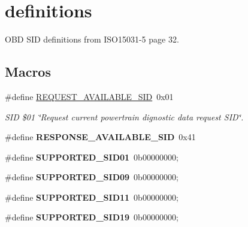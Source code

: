 \hypertarget{group__OBD__SID}{}\section{definitions}
\label{group__OBD__SID}


O\+BD S\+ID definitions from I\+S\+O15031-\/5 page 32.  


\subsection*{Macros}
\begin{DoxyCompactItemize}
\item 
\mbox{\label{group__OBD__SID_ga94a3417f78b904f0e9f461cce0b6641c}} 
\#define \hyperlink{group__OBD__SID_ga94a3417f78b904f0e9f461cce0b6641c}{R\+E\+Q\+U\+E\+S\+T\+\_\+\+A\+V\+A\+I\+L\+A\+B\+L\+E\+\_\+\+S\+ID}~0x01
\begin{DoxyCompactList}\small\item\em S\+ID \$01 \char`\"{}\+Request current powertrain dignostic data request S\+I\+D\char`\"{}. \end{DoxyCompactList}\item 
\mbox{\label{group__OBD__SID_ga59a24bd5d712dcfc0cc82303b8aac0b0}} 
\#define {\bfseries R\+E\+S\+P\+O\+N\+S\+E\+\_\+\+A\+V\+A\+I\+L\+A\+B\+L\+E\+\_\+\+S\+ID}~0x41
\item 
\mbox{\label{group__OBD__SID_gae4d5ffcfa37cfa6e858191b68a8ad72c}} 
\#define {\bfseries S\+U\+P\+P\+O\+R\+T\+E\+D\+\_\+\+S\+I\+D01}~0b00000000;
\item 
\mbox{\label{group__OBD__SID_ga34a3a33eeb5a57c0f2d575f3fda69d33}} 
\#define {\bfseries S\+U\+P\+P\+O\+R\+T\+E\+D\+\_\+\+S\+I\+D09}~0b00000000;
\item 
\mbox{\label{group__OBD__SID_gac5a9b7291411c8bc51112d74af772399}} 
\#define {\bfseries S\+U\+P\+P\+O\+R\+T\+E\+D\+\_\+\+S\+I\+D11}~0b00000000;
\item 
\mbox{\label{group__OBD__SID_ga95dcf703c72cd57005c7eb6d4f3681ec}} 
\#define {\bfseries S\+U\+P\+P\+O\+R\+T\+E\+D\+\_\+\+S\+I\+D19}~0b00000000;
\item 
\mbox{\label{group__OBD__SID_gab46d81c3fe9368515a4cf4ca4e642073}} 

\end{DoxyCompactItemize}
